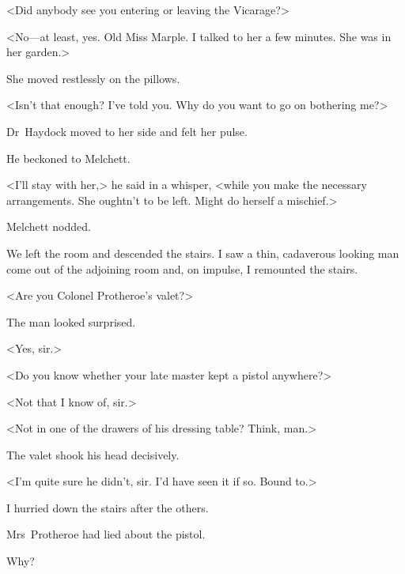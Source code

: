 <Did anybody see you entering or leaving the Vicarage?>

<No—at least, yes. Old Miss Marple. I talked to her a few minutes. She was in her garden.>

She moved restlessly on the pillows.

<Isn't that enough? I've told you. Why do you want to go on bothering me?>

Dr~Haydock moved to her side and felt her pulse.

He beckoned to Melchett.

<I'll stay with her,> he said in a whisper, <while you make the necessary arrangements. She oughtn't to be left. Might do herself a mischief.>

Melchett nodded.

We left the room and descended the stairs. I saw a thin, cadaverous looking man come out of the adjoining room and, on impulse, I remounted the stairs.

<Are you Colonel Protheroe's valet?>

The man looked surprised.

<Yes, sir.>

<Do you know whether your late master kept a pistol anywhere?>

<Not that I know of, sir.>

<Not in one of the drawers of his dressing table? Think, man.>

The valet shook his head decisively.

<I'm quite sure he didn't, sir. I'd have seen it if so. Bound to.>

I hurried down the stairs after the others.

Mrs~Protheroe had lied about the pistol.

Why?
